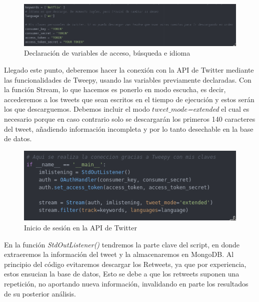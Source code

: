 \begin{figure}[h]
	\centering
	\includegraphics[scale=.4]{imagenes/token-ladron.png}
	\caption{Declaración de variables de acceso, búsqueda e idioma}
	\label{fig:token-ladron}
\end{figure}


Llegado este punto, deberemos hacer la conexión con la API de Twitter mediante las funcionalidades de Tweepy, usando las variables previamente declaradas. Con la función Stream, lo que hacemos es ponerlo en modo escucha, es decir, accederemos a los tweets que sean escritos en el tiempo de ejecución y estos serán los que descarguemos. Debemos incluir el modo \textit{$tweet\_mode$=extended} el cual es necesario porque en caso contrario solo se descargarán los primeros 140 caracteres del tweet, añadiendo información incompleta y por lo tanto desechable en la base de datos. 

\begin{figure}[h]
	\centering
	\includegraphics[scale=.5]{imagenes/inicio-sesion-ladron.png}
	\caption{Inicio de sesión en la API de Twitter}
	\label{fig:inicio-sesion-ladron}
\end{figure}


En la función \textit{StdOutListener()} tendremos la parte clave del script, en donde extraeremos la información del tweet y la almacenaremos en MongoDB. Al principio del código evitaremos descargar los Retweets, ya que por experiencia, estos ensucian la base de datos, Esto se debe a que los retweets suponen una repetición, no aportando nueva información, invalidando en parte los resultados de su posterior análisis. 

